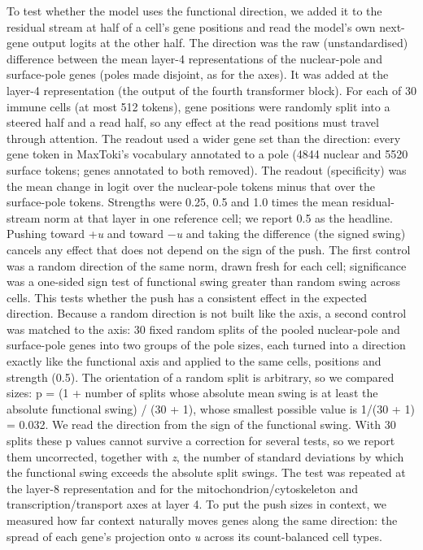 \documentclass[
  11pt,
]{article}
\begin{document}
To test whether the model uses the functional direction, we added it to
the residual stream at half of a cell's gene positions and read the
model's own next-gene output logits at the other half. The direction was
the raw (unstandardised) difference between the mean layer-4
representations of the nuclear-pole and surface-pole genes (poles made
disjoint, as for the axes). It was added at the layer-4 representation
(the output of the fourth transformer block). For each of 30 immune
cells (at most 512 tokens), gene positions were randomly split into a
steered half and a read half, so any effect at the read positions must
travel through attention. The readout used a wider gene set than the
direction: every gene token in MaxToki's vocabulary annotated to a pole
(4844 nuclear and 5520 surface tokens; genes annotated to both removed).
The readout (specificity) was the mean change in logit over the
nuclear-pole tokens minus that over the surface-pole tokens. Strengths
were 0.25, 0.5 and 1.0 times the mean residual-stream norm at that layer
in one reference cell; we report 0.5 as the headline. Pushing toward
+\emph{u} and toward −\emph{u} and taking the difference (the signed
swing) cancels any effect that does not depend on the sign of the push.
The first control was a random direction of the same norm, drawn fresh
for each cell; significance was a one-sided sign test of functional
swing greater than random swing across cells. This tests whether the
push has a consistent effect in the expected direction. Because a random
direction is not built like the axis, a second control was matched to
the axis: 30 fixed random splits of the pooled nuclear-pole and
surface-pole genes into two groups of the pole sizes, each turned into a
direction exactly like the functional axis and applied to the same
cells, positions and strength (0.5). The orientation of a random split
is arbitrary, so we compared sizes: p = (1 + number of splits whose
absolute mean swing is at least the absolute functional swing) / (30 +
1), whose smallest possible value is 1/(30 + 1) = 0.032. We read the
direction from the sign of the functional swing. With 30 splits these p
values cannot survive a correction for several tests, so we report them
uncorrected, together with \emph{z}, the number of standard deviations
by which the functional swing exceeds the absolute split swings. The
test was repeated at the layer-8 representation and for the
mitochondrion/cytoskeleton and transcription/transport axes at layer 4.
To put the push sizes in context, we measured how far context naturally
moves genes along the same direction: the spread of each gene's
projection onto \emph{u} across its count-balanced cell types.
\end{document}
